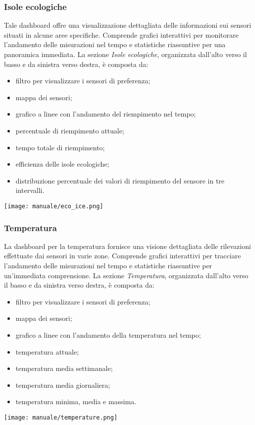 \subsubsection{Isole ecologiche}
Tale dashboard offre una visualizzazione dettagliata delle informazioni sui sensori situati in alcune aree specifiche. Comprende grafici interattivi per monitorare l'andamento delle misurazioni nel tempo e statistiche riassuntive per una panoramica immediata. La sezione \textit{Isole ecologiche}, organizzata dall'alto verso il basso e da sinistra verso destra, è composta da:
\begin{itemize}
    \item filtro per visualizzare i sensori di preferenza;
    \item mappa dei sensori;
    \item grafico a linee con l'andamento del riempimento nel tempo;
    \item percentuale di riempimento attuale;
    \item tempo totale di riempimento;
    \item efficienza delle isole ecologiche;
    \item distribuzione percentuale dei valori di riempimento del sensore in tre intervalli.
\end{itemize}
\begin{center}
    \texttt{[image: manuale/eco\_ice.png]}
\end{center}

\subsubsection{Temperatura}
La dashboard per la temperatura fornisce una visione dettagliata delle rilevazioni effettuate dai sensori in varie zone. Comprende grafici interattivi per tracciare l'andamento delle misurazioni nel tempo e statistiche riassuntive per un'immediata comprensione. La sezione \textit{Temperatura}, organizzata dall'alto verso il basso e da sinistra verso destra, è composta da:
\begin{itemize}
    \item filtro per visualizzare i sensori di preferenza;
    \item mappa dei sensori;
    \item grafico a linee con l'andamento della temperatura nel tempo;
    \item temperatura attuale;
    \item temperatura media settimanale;
    \item temperatura media giornaliera;
    \item temperatura minima, media e massima.
\end{itemize}
\begin{center}
    \texttt{[image: manuale/temperature.png]}
\end{center}

